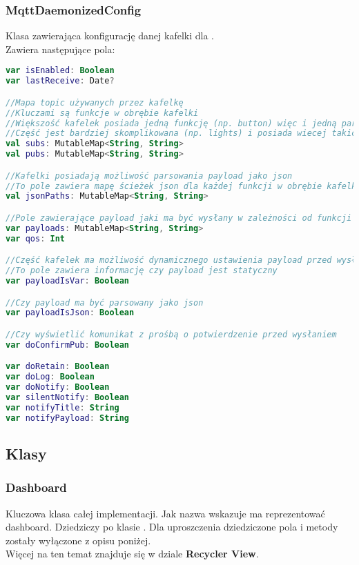 \subsubsection{MqttDaemonizedConfig}
Klasa zawierająca konfigurację danej kafelki dla .\\
Zawiera następujące pola:

\begin{lstlisting}[language=Kotlin]
var isEnabled: Boolean
var lastReceive: Date?

//Mapa topic używanych przez kafelkę
//Kluczami są funkcje w obrębie kafelki
//Większość kafelek posiada jedną funkcję (np. button) więc i jedną parę topic
//Część jest bardziej skomplikowana (np. lights) i posiada wiecej takich par
val subs: MutableMap<String, String>
val pubs: MutableMap<String, String>

//Kafelki posiadają możliwość parsowania payload jako json
//To pole zawiera mapę ścieżek json dla każdej funkcji w obrębie kafelki
val jsonPaths: MutableMap<String, String>

//Pole zawierające payload jaki ma być wysłany w zależności od funkcji kafelki
var payloads: MutableMap<String, String>
var qos: Int

//Część kafelek ma możliwość dynamicznego ustawienia payload przed wysłaniem
//To pole zawiera informację czy payload jest statyczny
var payloadIsVar: Boolean

//Czy payload ma być parsowany jako json
var payloadIsJson: Boolean

//Czy wyświetlić komunikat z prośbą o potwierdzenie przed wysłaniem
var doConfirmPub: Boolean

var doRetain: Boolean
var doLog: Boolean
var doNotify: Boolean
var silentNotify: Boolean
var notifyTitle: String
var notifyPayload: String
\end{lstlisting}

\newpage

\subsection{Klasy}
\subsubsection{Dashboard}
Kluczowa klasa całej implementacji. Jak nazwa wskazuje ma reprezentować dashboard. Dziedziczy po klasie . Dla uproszczenia dziedziczone pola i metody zostały wyłączone z opisu poniżej.\\
Więcej na ten temat znajduje się w dziale \textbf{Recycler View}.\\

